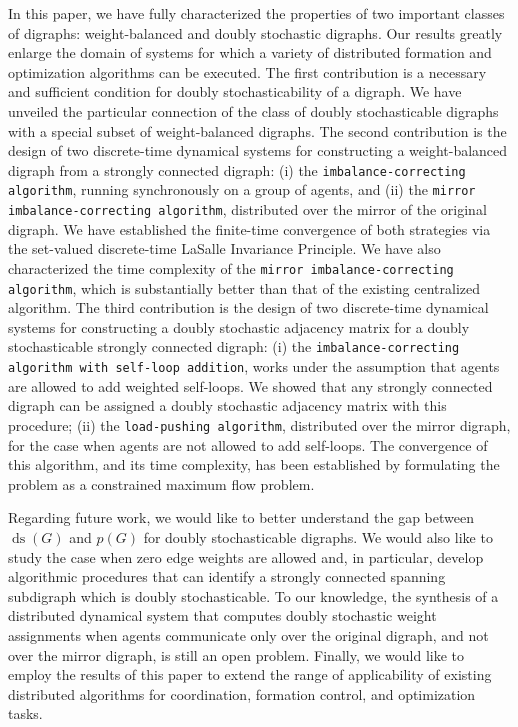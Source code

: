 \documentclass[final]{siamltex}
\begin{document}
In this paper, we have fully characterized the properties of two
important classes of digraphs: weight-balanced and doubly stochastic
digraphs. Our results greatly enlarge the domain of systems for which
a variety of distributed formation and optimization algorithms can be
executed.  The first contribution is a necessary and sufficient
condition for doubly stochasticability of a digraph.  We have unveiled
the particular connection of the class of doubly stochasticable
digraphs with a special subset of weight-balanced digraphs. The second
contribution is the design of two discrete-time dynamical systems for
constructing a weight-balanced digraph from a strongly connected
digraph: (i) the {\texttt{imbalance-correcting algorithm}\xspace}, running synchronously on a group of agents,
and (ii) the {\texttt{mirror imbalance-correcting
    algorithm}\xspace}, distributed over the mirror of the original
digraph.  We have established the finite-time convergence of both
strategies via the set-valued discrete-time LaSalle Invariance
Principle.
We have also characterized the time complexity of the {\texttt{mirror imbalance-correcting
    algorithm}\xspace}, which is
substantially better than that of the existing centralized algorithm.
The third contribution is the design of two discrete-time dynamical
systems for constructing a doubly stochastic adjacency matrix for a
doubly stochasticable strongly connected digraph: (i) the {\texttt{imbalance-correcting algorithm with
    self-loop addition}\xspace},
works under the assumption that agents are allowed to add weighted
self-loops. We showed that any strongly connected digraph can be
assigned a doubly stochastic adjacency matrix with this procedure;
(ii) the {\texttt{load-pushing algorithm}\xspace}, distributed over the mirror digraph, for the case
when agents are not allowed to add self-loops.  The convergence of
this algorithm, and its time complexity, has been established by
formulating the problem as a constrained maximum flow problem.

Regarding future work, we would like to better understand the gap
between ${\operatorname{ds}}(G)$ and $p(G)$ for doubly stochasticable digraphs. We
would also like to study the case when zero edge weights are allowed
and, in particular, develop algorithmic procedures that can identify a
strongly connected spanning subdigraph which is doubly stochasticable.
To our knowledge, the synthesis of a distributed dynamical system that
computes doubly stochastic weight assignments when agents communicate
only over the original digraph, and not over the mirror digraph, is
still an open problem.  Finally, we would like to employ the results
of this paper to extend the range of applicability of existing
distributed algorithms for coordination, formation control, and
optimization tasks.
\end{document}
